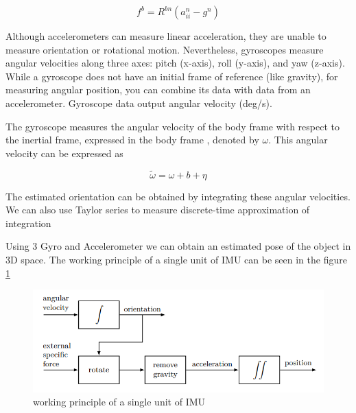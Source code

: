 \begin{equation}
f^{b}=R^{b n}\left(a_{i i}^{n}-g^{n}\right)
\end{equation}


Although accelerometers can measure linear acceleration, they are unable to measure orientation or rotational motion. Nevertheless, gyroscopes measure angular velocities along three axes: pitch (x-axis), roll (y-axis), and yaw (z-axis). While a gyroscope does not have an initial frame of reference (like gravity), for measuring angular position, you can combine its data with data from an accelerometer. Gyroscope data output angular velocity (deg/s).

The gyroscope measures the angular velocity of the body frame with respect to the inertial frame, expressed in the body frame \cite{ROS}, denoted by $\omega $. This angular velocity can be expressed as

\begin{equation}
\tilde{\omega}=\omega+b+\eta
\end{equation}

The estimated orientation can be obtained by integrating these angular velocities. We can also use Taylor series to measure discrete-time approximation of integration


Using 3 Gyro and Accelerometer we can obtain an estimated pose of the object in 3D space.
The working principle of a single unit of IMU can be seen in the figure \ref{fig:imuWP}


\begin{figure}[h]
  \centering
    \includegraphics[width=\linewidth]{figures/imuWP.png}
    \caption{ working principle of a single unit of IMU }
\label{fig:imuWP}
\end{figure}






